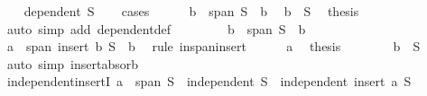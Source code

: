 \begin{isabellebody}
\ \ \isamarkupfalse%
\ {\isachardoublequoteopen}dependent\ S{\isachardoublequoteclose}\isanewline
\ \ \isamarkupfalse%
\ cases\isanewline
\ \ \ \ \isamarkupfalse%
\ {\isachardoublequoteopen}b\ {\isasymin}\ span\ {\isacharparenleft}{\kern0pt}S\ {\isacharminus}{\kern0pt}\ {\isacharbraceleft}{\kern0pt}b{\isacharbraceright}{\kern0pt}{\isacharparenright}{\kern0pt}{\isachardoublequoteclose}\ \isamarkupfalse%
\ {\isacartoucheopen}b\ {\isasymin}\ S{\isacartoucheclose}\ \isamarkupfalse%
\ {\isacharquery}{\kern0pt}thesis\isanewline
\ \ \ \ \ \ \isamarkupfalse%
\ {\isacharparenleft}{\kern0pt}auto\ simp\ add{\isacharcolon}{\kern0pt}\ dependent{\isacharunderscore}{\kern0pt}def{\isacharparenright}{\kern0pt}\isanewline
\ \ \isamarkupfalse%
\isanewline
\ \ \ \ \isamarkupfalse%
\ {\isachardoublequoteopen}b\ {\isasymnotin}\ span\ {\isacharparenleft}{\kern0pt}S\ {\isacharminus}{\kern0pt}\ {\isacharbraceleft}{\kern0pt}b{\isacharbraceright}{\kern0pt}{\isacharparenright}{\kern0pt}{\isachardoublequoteclose}\isanewline
\ \ \ \ \isamarkupfalse%
\ {\isacharasterisk}{\kern0pt}\ \isamarkupfalse%
\ {\isachardoublequoteopen}a\ {\isasymin}\ span\ {\isacharparenleft}{\kern0pt}insert\ b\ {\isacharparenleft}{\kern0pt}S\ {\isacharminus}{\kern0pt}\ {\isacharbraceleft}{\kern0pt}b{\isacharbraceright}{\kern0pt}{\isacharparenright}{\kern0pt}{\isacharparenright}{\kern0pt}{\isachardoublequoteclose}\ \isamarkupfalse%
\ {\isacharparenleft}{\kern0pt}rule\ in{\isacharunderscore}{\kern0pt}span{\isacharunderscore}{\kern0pt}insert{\isacharparenright}{\kern0pt}\isanewline
\ \ \ \ \isamarkupfalse%
\ a\ \isamarkupfalse%
\ {\isacharquery}{\kern0pt}thesis\isanewline
\ \ \ \ \ \ \isamarkupfalse%
\ {\isacartoucheopen}b\ {\isasymin}\ S{\isacartoucheclose}\ \isamarkupfalse%
\ {\isacharparenleft}{\kern0pt}auto\ simp{\isacharcolon}{\kern0pt}\ insert{\isacharunderscore}{\kern0pt}absorb{\isacharparenright}{\kern0pt}\isanewline
\ \ \isamarkupfalse%
\isanewline
{}\isamarkupfalse%
%
\endisatagproof
{\isafoldproof}%
%
\isadelimproof
\isanewline
%
\endisadelimproof
\isanewline
{}\isamarkupfalse%
\ independent{\isacharunderscore}{\kern0pt}insertI{\isacharcolon}{\kern0pt}\ {\isachardoublequoteopen}a\ {\isasymnotin}\ span\ S\ {\isasymLongrightarrow}\ independent\ S\ {\isasymLongrightarrow}\ independent\ {\isacharparenleft}{\kern0pt}insert\ a\ S{\isacharparenright}{\kern0pt}{\isachardoublequoteclose}\isanewline

\end{isabellebody}
